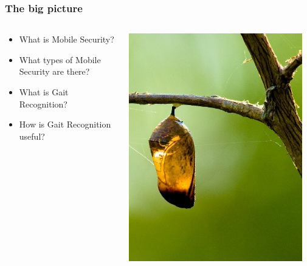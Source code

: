 \documentclass{beamer}
\begin{document}
\begin{frame}
  \frametitle{The big picture}
  
  \begin{columns}
  \begin{column}{0.6\textwidth}
  \begin{itemize}
  	\item What is Mobile Security?
	\item What types of Mobile Security are there?
	\item What is Gait Recognition?
	\item How is Gait Recognition useful?
  \end{itemize}
  \end{column}
  \begin{column}{0.4\textwidth}
   \includegraphics[width=0.95\textwidth]{Illustrations/Empty_cocoon_crop_by_Bluedrakon_from_Flickr.jpg}
       \\
  \end{column}
  \end{columns}
\end{frame}
\end{document}
